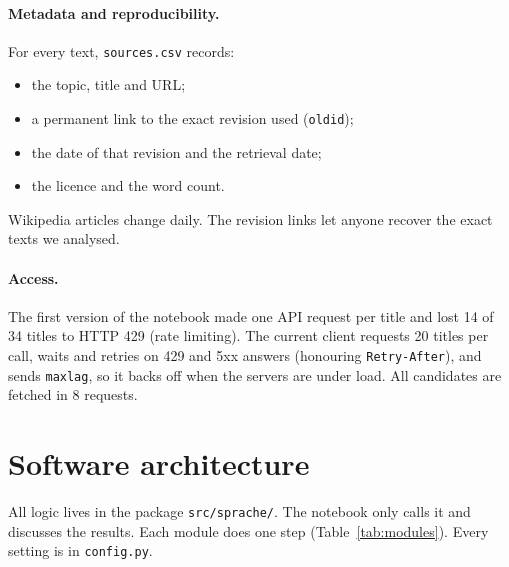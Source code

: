 \documentclass[11pt,a4paper]{article}
\newcommand{\code}[1]{\texttt{#1}}
\begin{document}
\paragraph{Metadata and reproducibility.} For every text, \code{sources.csv} records:
\begin{itemize}
  \item the topic, title and URL;
  \item a permanent link to the exact revision used (\code{oldid});
  \item the date of that revision and the retrieval date;
  \item the licence and the word count.
\end{itemize}
Wikipedia articles change daily. The revision links let anyone recover the exact texts we analysed.

\paragraph{Access.} The first version of the notebook made one API request per title and lost 14 of 34 titles to HTTP 429 (rate limiting). The current client requests 20 titles per call, waits and retries on 429 and 5xx answers (honouring \code{Retry-After}), and sends \code{maxlag}, so it backs off when the servers are under load. All \NCandidates{} candidates are fetched in 8 requests.

\section{Software architecture}\label{sec:arch}
All logic lives in the package \code{src/sprache/}. The notebook only calls it and discusses the results. Each module does one step (Table~\ref{tab:modules}). Every setting is in \code{config.py}.
\end{document}
